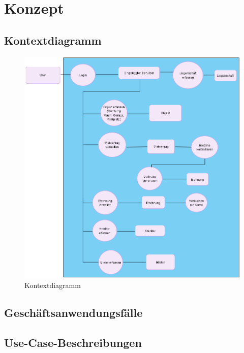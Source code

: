 \section{Konzept}

\subsection{Kontextdiagramm}
\begin{figure}[H]
  \begin{center}
    \includegraphics[width=0.99\linewidth]{content/diagrams/out/contextdiagram/context.png}
    \caption{Kontextdiagramm}
  \end{center}
  \label{contextdiag}
\end{figure}

\subsection{Geschäftsanwendungsfälle}


\subsection{Use-Case-Beschreibungen}


